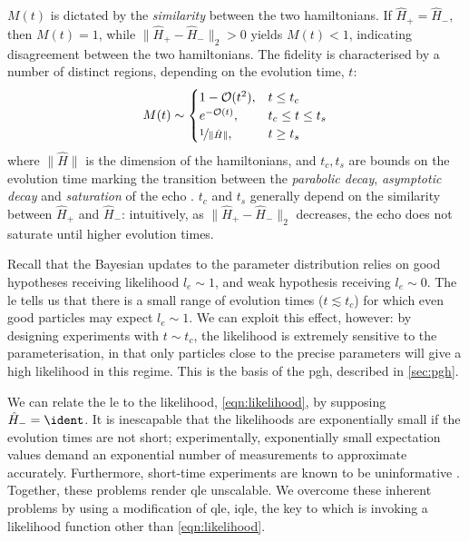 $M(t)$ is dictated by the \emph{similarity} between the two \glspl{hamiltonian}.
If $\hat{H}_{+} = \hat{H}_{-}$, then $M(t) = 1$, while $\|\hat{H}_{+} - \hat{H}_{-} \|_2 > 0$ yields $M(t) < 1$, 
    indicating disagreement between the two \glspl{hamiltonian}. 
The fidelity is characterised by a number of distinct regions, depending on the evolution time, $t$:
\begin{align}
    \label{eqn:loschmidt_ranges}
    M(t) \sim 
    \begin{cases}
        1 - \mathcal{O}(t^2),  & t \leq t_c \\
        e^{-\mathcal{O}(t)}, & t_c \leq t \leq t_{s} \\
        \nicefrac{1}{\| \hat{H} \|}, & t \geq t_{s}
    \end{cases}
\end{align}
    where $\|\hat{H}\|$ is the dimension of the \glspl{hamiltonian}, and $t_c, t_{s}$ are bounds on the evolution time marking the transition between the 
    \emph{parabolic decay}, \emph{asymptotic decay} and \emph{saturation} of the echo \cite{goussev2012loschmidt}. 
$t_c$ and $t_s$ generally depend on the similarity between $\hat{H}_+$ and $\hat{H}_{-}$: 
    intuitively, as $\|\hat{H}_+ - \hat{H}_{-}\|_2$ decreases, the echo does not saturate until higher evolution times. 
\par 

Recall that the Bayesian updates to the parameter distribution relies on good hypotheses receiving likelihood $l_e \sim 1$,
    and weak hypothesis receiving $l_e \sim 0$. 
The \gls{le} tells us that there is a small range of evolution times ($t \lesssim t_c$) for which even good \glspl{particle} may expect $l_e \sim 1$.
We can exploit this effect, however: 
    by designing \glspl{experiment} with $t \sim t_c$, the likelihood is extremely sensitive to the parameterisation, 
    in that only \glspl{particle} close to the precise parameters will give a high likelihood in this regime. 
This is the basis of the \acrlong{pgh}, described in \cref{sec:pgh}. 
\par 

We can relate the \gls{le} to the likelihood, \cref{eqn:likelihood}, by supposing $\hat{H}_{-} = \ident$. 
It is inescapable that the \glspl{likelihood} are exponentially small if the evolution times are not short;
    experimentally, exponentially small expectation values demand an exponential number of measurements to approximate accurately.
Furthermore, short-time \glspl{experiment} are known to be uninformative \cite{wiebe2014qhlpra, wiebe2015quantum}.
Together, these problems render \gls{qle} unscalable.
We overcome these inherent problems by using a modification of \gls{qle}, \gls{iqle},
    the key to which is invoking a \gls{likelihood} function other than \cref{eqn:likelihood}.
    

